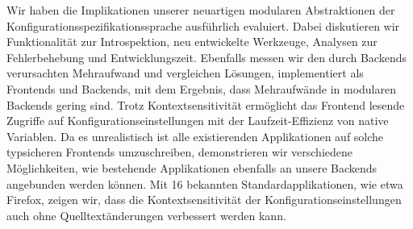 Wir haben die Implikationen unserer neuartigen modularen Abstraktionen der Konfigurationsspezifikationssprache ausführlich evaluiert.
Dabei diskutieren wir Funktionalität zur Introspektion, neu entwickelte Werkzeuge, Analysen zur Fehlerbehebung und Entwicklungszeit.
Ebenfalls messen wir den durch Backends verursachten Mehraufwand und vergleichen Lösungen, implementiert als Frontends und Backends, mit dem Ergebnis, dass Mehraufwände in modularen Backends gering sind.
Trotz Kontextsensitivität ermöglicht das Frontend lesende Zugriffe auf Konfigurationseinstellungen mit der Laufzeit-Effizienz von native Variablen.
Da es unrealistisch ist alle existierenden Applikationen auf solche typsicheren Frontends umzuschreiben, demonstrieren wir verschiedene Möglichkeiten, wie bestehende Applikationen ebenfalls an unsere Backends angebunden werden können.
Mit 16 bekannten Standardapplikationen, wie etwa Firefox, zeigen wir, dass die Kontextsensitivität der Konfigurationseinstellungen auch ohne Quelltextänderungen verbessert werden kann.
